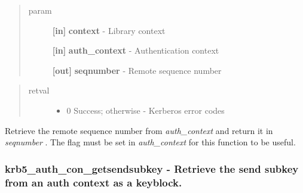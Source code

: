\documentclass[letterpaper,10pt,english]{sphinxmanual}
\begin{document}
\begin{quote}\begin{description}
\item[{param}] \leavevmode
\textbf{{[}in{]}} \textbf{context} - Library context

\textbf{{[}in{]}} \textbf{auth\_context} - Authentication context

\textbf{{[}out{]}} \textbf{seqnumber} - Remote sequence number

\end{description}\end{quote}
\begin{quote}\begin{description}
\item[{retval}] \leavevmode\begin{itemize}
\item {} 
0   Success; otherwise - Kerberos error codes

\end{itemize}

\end{description}\end{quote}

Retrieve the remote sequence number from \emph{auth\_context} and return it in \emph{seqnumber} . The {\hyperref[appdev/refs/macros/KRB5_AUTH_CONTEXT_DO_SEQUENCE:KRB5_AUTH_CONTEXT_DO_SEQUENCE]{}} flag must be set in \emph{auth\_context} for this function to be useful.


\subsubsection{krb5\_auth\_con\_getsendsubkey -  Retrieve the send subkey from an auth context as a keyblock.}
\label{appdev/refs/api/krb5_auth_con_getsendsubkey:krb5-auth-con-getsendsubkey-retrieve-the-send-subkey-from-an-auth-context-as-a-keyblock}\label{appdev/refs/api/krb5_auth_con_getsendsubkey::doc}

\begin{fulllineitems}
\label{appdev/refs/api/krb5_auth_con_getsendsubkey:krb5_auth_con_getsendsubkey}
\end{fulllineitems}
\end{document}
